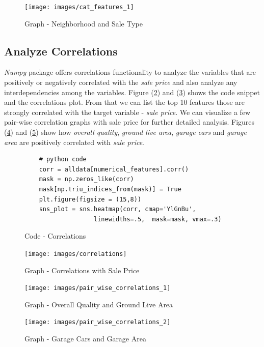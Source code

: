 \documentclass[sigconf]{acmart}
\begin{document}
\begin{figure}[htb]
	\centering
	\texttt{[image: images/cat\_features\_1]}	
	\caption{Graph - Neighborhood and Sale Type} \label{fig:cat_features_1} 
\end{figure}
	
	\subsection{Analyze Correlations}		
	{\em Numpy} package offers correlations functionality to analyze the variables that are positively or negatively correlated with the {\em sale price} and also analyze any interdependencies among the variables. Figure (\ref{c:cor}) and (\ref{fig:correlations}) shows the code snippet and the correlations plot. From that we can list the top 10 features those are strongly correlated with the target variable - {\em sale price}. We can visualize a few pair-wise correlation graphs with sale price for further detailed analysis. Figures (\ref{fig:pair-wise-correlations}) and (\ref{fig:pair-wise-correlations-2}) show how {\em overall quality}, {\em ground live area}, {\em garage cars} and {\em garage area} are positively correlated with {\em sale price}.
	
	\begin{figure}[htb]
	\begin{verbatim}	
	# python code 
	corr = alldata[numerical_features].corr()	
	mask = np.zeros_like(corr)
	mask[np.triu_indices_from(mask)] = True	
	plt.figure(figsize = (15,8))	
	sns_plot = sns.heatmap(corr, cmap='YlGnBu', 
	               linewidths=.5,  mask=mask, vmax=.3)	
	\end{verbatim}
	\caption{Code - Correlations} \label{c:cor} 
	\end{figure}

	\begin{figure}[htb]
		\centering
		\texttt{[image: images/correlations]}	
		\caption{Graph - Correlations with Sale Price} \label{fig:correlations} 
	\end{figure}
		
	\begin{figure}[htb]
		\centering
		\texttt{[image: images/pair\_wise\_correlations\_1]}	
		\caption{Graph - Overall Quality and Ground Live Area} \label{fig:pair-wise-correlations} 
	\end{figure}

	\begin{figure}[htb]
	\centering
	\texttt{[image: images/pair\_wise\_correlations\_2]}	
	\caption{Graph - Garage Cars and Garage Area} \label{fig:pair-wise-correlations-2} 
	\end{figure}
\end{document}
